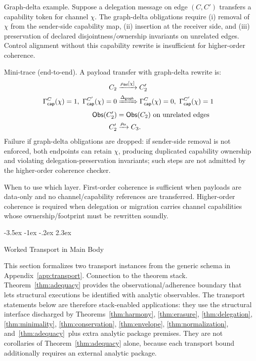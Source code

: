 \documentclass[a4paper,10pt,twocolumn,english]{article}
\makeatletter
\renewcommand{\section}{\@startsection{section}{1}{\z@}%
  {-3.5ex \@plus -1ex \@minus -.2ex}%
  {2.3ex}%
  {\raggedright\normalfont\large\bfseries}}
\numberwithin{equation}{section}
\theoremstyle{paperdef}
\theoremstyle{paperplain}
\theoremstyle{paperdef}
\theoremstyle{paperremark}
\theoremstyle{paperdef}
\newcommand{\Obs}{\ensuremath{\mathsf{Obs}}}
\newcommand{\ABHStack}{Theorems~\ref{thm:harmony}, \ref{thm:erasure}, \ref{thm:delegation}, \ref{thm:minimality}, \ref{thm:conservation}, \ref{thm:envelope}, \ref{thm:normalization}, and~\ref{thm:adequacy}}
\makeatother
\begin{document}
Graph-delta example. Suppose a delegation message on edge $(C,C')$ transfers a
capability token for channel $\chi$. The graph-delta obligations require
(i) removal of $\chi$ from the sender-side capability map,
(ii) insertion at the receiver side, and
(iii) preservation of declared disjointness/ownership invariants on unrelated
edges. Control alignment without this capability rewrite is insufficient for
higher-order coherence.

Mini-trace (end-to-end). A payload transfer with graph-delta rewrite is:
\[
	\begin{aligned}[t]
		C_2        & \xrightarrow{\rho_{\mathsf{del}}[\chi]} C_2'              \\
		\Gamma_{\mathsf{cap}}^{C}(\chi)=1,\ \Gamma_{\mathsf{cap}}^{C'}(\chi)=0
		           & \xRightarrow{\Delta_{\mathsf{graph}}}
		\Gamma_{\mathsf{cap}}^{C}(\chi)=0,\ \Gamma_{\mathsf{cap}}^{C'}(\chi)=1 \\
		\Obs(C_2') & = \Obs(C_2)\ \text{on unrelated edges}                    \\
		C_2'       & \xrightarrow{\rho_{\mathsf{tr}}} C_3.
	\end{aligned}
\]
Failure if graph-delta obligations are dropped: if sender-side removal is not
enforced, both endpoints can retain $\chi$, producing duplicated capability
ownership and violating delegation-preservation invariants; such steps are not
admitted by the higher-order coherence checker.

When to use which layer. First-order coherence is sufficient when payloads are
data-only and no channel/capability references are transferred. Higher-order
coherence is required when delegation or migration carries channel capabilities
whose ownership/footprint must be rewritten soundly.

\section{Worked Transport in Main Body}
\label{sec:transport}

This section formalizes two transport instances from the generic schema in Appendix~\ref{app:transport}.
Connection to the theorem stack. Theorem~\ref{thm:adequacy} provides the
observational/adherence boundary that lets structural executions be identified
with analytic observables. The transport statements below are therefore
stack-enabled applications: they use the structural interface discharged by
\ABHStack\ plus extra analytic package premises.
They are not corollaries of Theorem~\ref{thm:adequacy} alone, because each
transport bound additionally requires an external analytic package.
\end{document}
